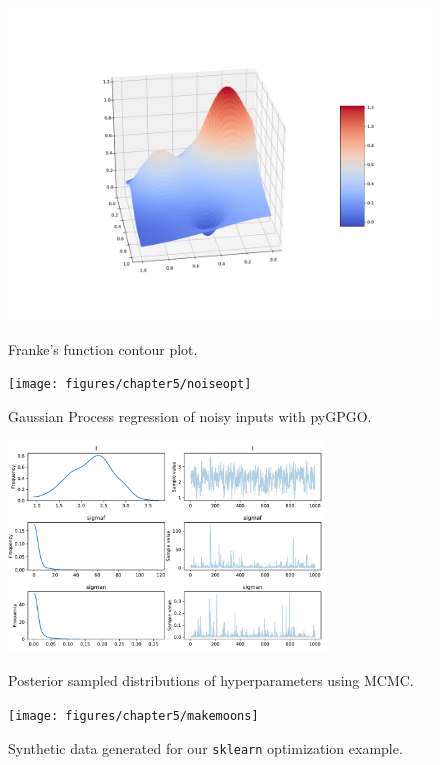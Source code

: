 \documentclass[10pt,a4paper,twoside]{book}
\begin{document}
\begin{figure}
\centering
\caption{Franke's function contour plot.}
\includegraphics[width=\textwidth]{figures/chapter5/franke}
\label{fig:franke}
\end{figure}


\begin{figure}
\centering
\caption{Gaussian Process regression of noisy inputs with pyGPGO.}
\texttt{[image: figures/chapter5/noiseopt]}
\label{fig:noiseopt}
\end{figure}

\begin{figure}
\centering
\caption{Posterior sampled distributions of hyperparameters using MCMC.}
\includegraphics[width=0.75\textwidth]{figures/chapter5/hyperpost}
\label{fig:hyperpost}
\end{figure}


\begin{figure}
\centering
\caption{Synthetic data generated for our \texttt{sklearn} optimization example.}
\texttt{[image: figures/chapter5/makemoons]}
\label{fig:makemoons}
\end{figure}
\end{document}
